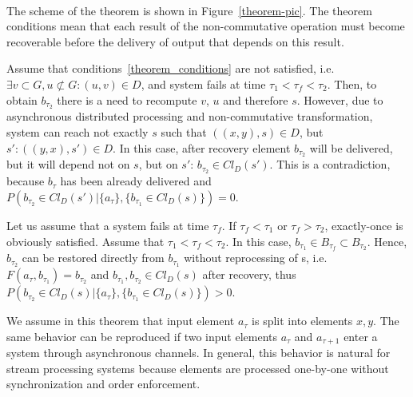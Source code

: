 \begin{sketch}
$ $\newline

The scheme of the theorem is shown in Figure~\ref{theorem-pic}. The theorem conditions mean that each result of the non-commutative operation must become recoverable before the delivery of output that depends on this result. 
$ $\newline

\newline

  Assume that conditions~\ref{theorem_conditions} are not satisfied, i.e. $\exists v \subset G, u \not\subset G: (u, v) \in D$, and system fails at time $\tau_1<\tau_f<\tau_2$. Then, to obtain $b_{\tau_2}$ there is a need to recompute $v$, $u$ and therefore $s$. However, due to asynchronous distributed processing and non-commutative transformation, system can reach not exactly $s$ such that $((x,y), s) \in D$, but $s':((y,x),s')\in D$. In this case, after recovery element $b_{\tau_2}$ will be delivered, but it will depend not on $s$, but on $s'$: $b_{\tau_2}\in Cl_D(s')$. This is a contradiction, because $b_\tau$ has been already delivered and $P(b_{\tau_2}\in Cl_D(s')|\{a_\tau\},\{b_{\tau_1} \in Cl_D(s) \})=0$.
$ $\newline

\newline

Let us assume that a  system fails at time $\tau_f$. If $\tau_f < \tau_1$ or $\tau_f > \tau_2$,  exactly-once is obviously satisfied. Assume that $\tau_1<\tau_f<\tau_2$. In this case, $b_{\tau_1}\in B_{\tau_f}\subset B_{\tau_2}$. Hence, $b_{\tau_2}$ can be restored directly from $b_{\tau_1}$ without reprocessing of s, i.e. $F(a_\tau,b_{\tau_1})=b_{\tau_2}$ and $b_{\tau_1}, b_{\tau_2} \in Cl_D(s)$ after recovery, thus $P(b_{\tau_2}\in Cl_D(s)|\{a_\tau\},\{b_{\tau_1} \in Cl_D(s) \})>0$.
\end{sketch}


We assume   in this  theorem    that input element $a_\tau$ is split into elements $x,y$. The same behavior can be reproduced if two input elements $a_\tau$ and $a_{\tau+1}$ enter a system through asynchronous channels. In general, this behavior is natural for stream processing systems because elements are processed one-by-one without synchronization and order enforcement. 

